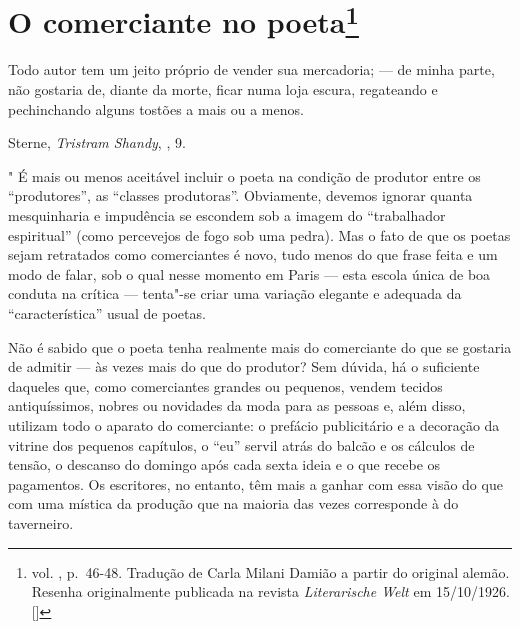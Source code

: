 \chapter{O comerciante no poeta\footnote[*]{ vol. , p.~46-48. Tradução de Carla Milani Damião a partir do
  original alemão. Resenha originalmente publicada na revista
  \emph{Literarische Welt} em 15/10/1926. []}}

\epigraph{Todo autor tem um jeito próprio de vender sua mercadoria; --- de minha
parte, não gostaria de, diante da morte, ficar numa loja escura,
regateando e pechinchando alguns tostões a mais ou a menos.}{Sterne, \emph{Tristram Shandy}, , 9.\footnotemark}

"
É mais ou menos aceitável incluir o poeta na condição de produtor entre
os ``produtores'', as ``classes produtoras''. Obviamente, devemos ignorar
quanta mesquinharia e impudência se escondem sob a imagem do
``trabalhador espiritual'' (como percevejos de fogo sob uma pedra). Mas o
fato de que os poetas sejam retratados como comerciantes é novo, tudo
menos do que frase feita e um modo de falar, sob o qual nesse momento em
Paris --- esta escola única de boa conduta na crítica --- tenta"-se criar
uma variação elegante e adequada da ``característica'' usual de poetas.

Não é sabido que o poeta tenha realmente mais do comerciante do que se
gostaria de admitir --- às vezes mais do que do produtor? Sem dúvida, há o
suficiente daqueles que, como comerciantes grandes ou pequenos, vendem
tecidos antiquíssimos, nobres ou novidades da moda para as pessoas e,
além disso, utilizam todo o aparato do comerciante: o prefácio
publicitário e a decoração da vitrine dos pequenos capítulos, o ``eu''
servil atrás do balcão e os cálculos de tensão, o descanso do domingo
após cada sexta ideia e o que recebe os pagamentos. Os escritores, no
entanto, têm mais a ganhar com essa visão do que com uma mística da
produção que na maioria das vezes corresponde à do taverneiro.

